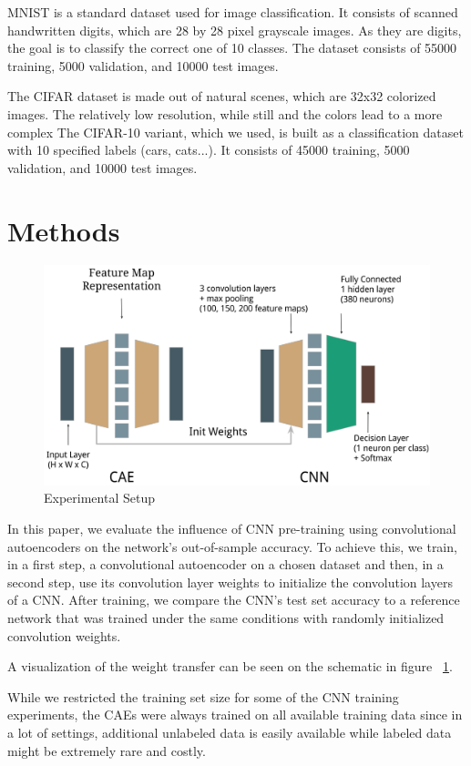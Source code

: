\documentclass{article}
\begin{document}
MNIST \citep{lecun1998mnist} is a standard dataset used for image classification. It consists of scanned handwritten digits, which are 28 by 28 pixel grayscale images. As they are digits, the goal is to classify the correct one of 10 classes.
The dataset consists of 55000 training, 5000 validation, and 10000 test images.

The CIFAR dataset \citep{krizhevsky2009learning} is made out of natural scenes, which are 32x32 colorized images. The relatively low resolution, while still and the colors lead to a more complex
The CIFAR-10 variant, which we used, is built as a classification dataset with 10 specified labels (cars, cats...).
It consists of 45000 training, 5000 validation, and 10000 test images.

\section{Methods}

  \begin{figure}%
    \centering
    \includegraphics[width=0.6\linewidth]{../graphics/setup.png}
    \caption{Experimental Setup}
    \label{fig:experimental_setup}
  \end{figure}

  In this paper, we evaluate the influence of CNN pre-training using convolutional autoencoders on the network's out-of-sample accuracy. To achieve this, we train, in a first step, a convolutional autoencoder on a chosen dataset and then, in a second step, use its convolution layer weights to initialize the convolution layers of a CNN. After training, we compare the CNN's test set accuracy to a reference network that was trained under the same conditions with randomly initialized convolution weights. 

  A visualization of the weight transfer can be seen on the schematic in figure ~\ref{fig:experimental_setup}. 

  While we restricted the training set size for some of the CNN training experiments, the CAEs were always trained on all available training data since in a lot of settings, additional unlabeled data is easily available while labeled data might be extremely rare and costly.  
\end{document}
